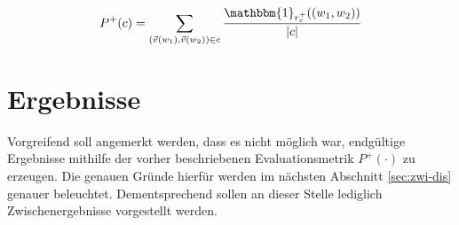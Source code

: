 \begin{equation}
  P^+(c) = \sum_{(\vec{v}(w_1), \vec{v}(w_2)) \in c} \frac{\mathbbm{1}_{r_c^+}((w_1, w_2))}{|c|}
\end{equation}

\section{Ergebnisse}

Vorgreifend soll angemerkt werden, dass es nicht möglich war, endgültige Ergebnisse mithilfe der vorher beschriebenen
Evaluationsmetrik $P^+(\cdot)$ zu erzeugen. Die genauen Gründe hierfür werden im nächsten Abschnitt \ref{sec:zwi-dis}
genauer beleuchtet. Dementsprechend sollen an dieser Stelle lediglich Zwischenergebnisse vorgestellt werden.\\

